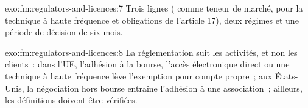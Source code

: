 \begin{solution}{exo:fm:regulators-and-licences:7}
Trois lignes ( comme teneur de marché,  pour la technique à haute fréquence et obligations de l'article 17), deux régimes et une
période de décision de six mois.
\end{solution}

\begin{solution}{exo:fm:regulators-and-licences:8}
La réglementation suit les activités, et non les clients~: dans l'UE, l'adhésion à la bourse, l'accès électronique direct ou une technique à haute fréquence lève
l'exemption pour compte propre~; aux États-Unis, la négociation hors bourse entraîne l'adhésion à une association~; ailleurs, les définitions doivent être vérifiées.
\end{solution}


